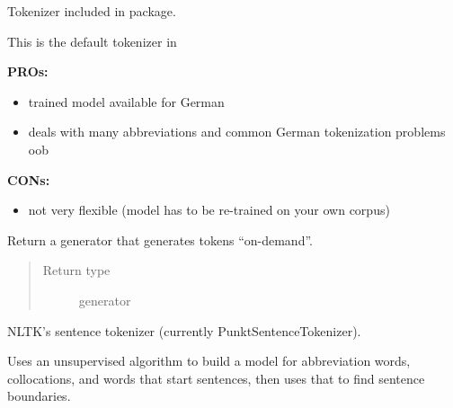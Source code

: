 \documentclass[letterpaper,10pt,english]{sphinxmanual}
\begin{document}
\begin{fulllineitems}
\label{api_reference:textblob_de.tokenizers.NLTKPunktTokenizer}
Tokenizer included in  package.

This is the default tokenizer in 

\textbf{PROs:}
\begin{itemize}
\item {} 
trained model available for German

\item {} 
deals with many abbreviations and common German tokenization problems oob

\end{itemize}

\textbf{CONs:}
\begin{itemize}
\item {} 
not very flexible (model has to be re-trained on your own corpus)

\end{itemize}

\begin{fulllineitems}
\label{api_reference:textblob_de.tokenizers.NLTKPunktTokenizer.itokenize}
Return a generator that generates tokens ``on-demand''.

\begin{quote}\begin{description}
\item[{Return type}] \leavevmode
generator

\end{description}\end{quote}

\end{fulllineitems}


\begin{fulllineitems}
\label{api_reference:textblob_de.tokenizers.NLTKPunktTokenizer.sent_tokenize}
NLTK's sentence tokenizer (currently PunktSentenceTokenizer).

Uses an unsupervised algorithm to build a model for abbreviation
words, collocations, and words that start sentences, then uses
that to find sentence boundaries.


\end{fulllineitems}
\end{fulllineitems}
\end{document}
